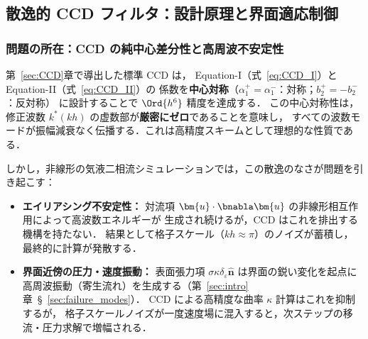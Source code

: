 %
%

\subsection{散逸的 CCD フィルタ：設計原理と界面適応制御}
\label{sec:dissipative_ccd}

\subsubsection{問題の所在：CCD の純中心差分性と高周波不安定性}
\label{sec:dccd_motivation}

第~\ref{sec:CCD}章で導出した標準 CCD は，
Equation-I（式~\eqref{eq:CCD_I}）と Equation-II（式~\eqref{eq:CCD_II}）の
係数を\textbf{中心対称}（$\alpha_1^+ = \alpha_1^-$：対称；$b_2^+ = -b_2^-$：反対称）
に設計することで $\Ord{h^6}$ 精度を達成する．
この中心対称性は，修正波数 $k^*(kh)$ の虚数部が\textbf{厳密にゼロ}であることを意味し，
すべての波数モードが振幅減衰なく伝播する．これは高精度スキームとして理想的な性質である．

しかし，非線形の気液二相流シミュレーションでは，この散逸のなさが問題を引き起こす：
\begin{itemize}
  \item \textbf{エイリアシング不安定性：}
        対流項 $\bm{u}\cdot\bnabla\bm{u}$ の非線形相互作用によって高波数エネルギーが
        生成され続けるが，CCD はこれを排出する機構を持たない．
        結果として格子スケール（$kh \approx \pi$）のノイズが蓄積し，
        最終的に計算が発散する．
  \item \textbf{界面近傍の圧力・速度振動：}
        表面張力項 $\sigma\kappa\delta_\varepsilon\hat{\bm{n}}$ は界面の鋭い変化を起点に
        高周波振動（寄生流れ）を生成する（第~\ref{sec:intro}章~§~\ref{sec:failure_modes}）．
        CCD による高精度な曲率 $\kappa$ 計算はこれを抑制するが，
        格子スケールノイズが一度速度場に混入すると，次ステップの移流・圧力求解で増幅される．
\end{itemize}

